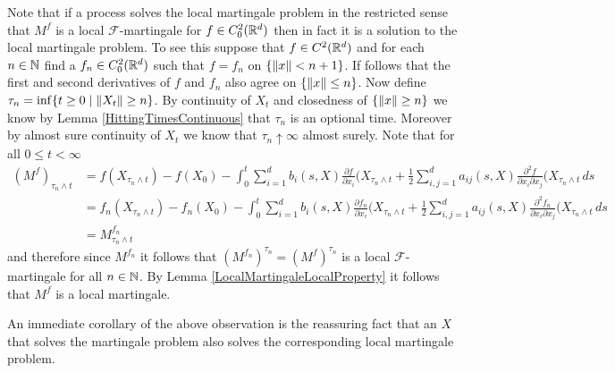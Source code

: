 Note that if a process solves the local martingale problem in the restricted sense that $M^f$ is a local $\mathcal{F}$-martingale for $f \in C^2_0(\mathbb{R}^d)$ then in fact it is a solution to the local martingale problem.  To see this suppose that $f \in C^2(\mathbb{R}^d)$ and for each $n \in \mathbb{N}$ find a $f_n \in C^2_0(\mathbb{R}^d)$ such that $f = f_n$ on  $\lbrace \lVert x \rVert < n+1 \rbrace$.  If follows that the first and second derivatives of $f$ and $f_n$ also agree on $\lbrace \lVert x \rVert \leq n \rbrace$.  Now define $\tau_n = \inf \lbrace t \geq 0 \mid \lVert X_t \rVert \geq n \rbrace$.  By continuity of $X_t$ and closedness of $\lbrace \lVert x \rVert \geq n \rbrace$ we know by Lemma \ref{HittingTimesContinuous} that $\tau_n$  is an optional time.  Moreover by almost sure continuity of $X_t$ we know that $\tau_n \uparrow \infty$ almost surely.  Note that for all $0 \leq t < \infty$
\begin{align*}
(M^f)_{\tau_n \wedge t} &= f(X_{\tau_n \wedge t}) - f(X_0) - \int_0^t \sum_{i=1}^d b_i(s,X) \frac{\partial f}{\partial x_i}(X_{\tau_n \wedge t} + \frac{1}{2} \sum_{i,j=1}^d a_{ij}(s,X) \frac{\partial^2 f}{\partial x_i \partial x_j}(X_{\tau_n \wedge t} \, ds \\
&=f_n(X_{\tau_n \wedge t}) - f_n(X_0) - \int_0^t \sum_{i=1}^d b_i(s,X) \frac{\partial f_n}{\partial x_i}(X_{\tau_n \wedge t} + \frac{1}{2} \sum_{i,j=1}^d a_{ij}(s,X) \frac{\partial^2 f_n}{\partial x_i \partial x_j}(X_{\tau_n \wedge t} \, ds \\
&=M^{f_n}_{\tau_n \wedge t}
\end{align*}
and therefore since $M^{f_n}$ it follows that $(M^{f_n})^{\tau_n} = (M^{f})^{\tau_n}$ is a local $\mathcal{F}$-martingale for all $n \in \mathbb{N}$.  By Lemma \ref{LocalMartingaleLocalProperty} it follows that $M^f$ is a local martingale.

An immediate corollary of the above observation is the reassuring fact that an $X$ that solves the martingale problem also solves the corresponding local martingale problem.

